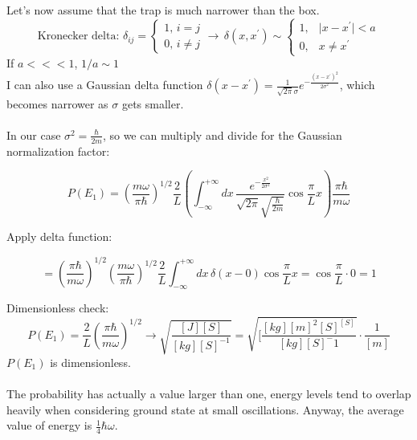 \noindent
Let's now assume that the trap is much narrower than the box.
\[\text{Kronecker delta: }  \delta_{i j}=\begin{cases}1,\, i=j \\ 0,\, i \neq j \end{cases} \rightarrow\, \delta(x, x^{\prime}) \sim\begin{cases}1,& \mid x-x^{\prime} \mid<a \\ 0, & x \neq x^{\prime}\end{cases}
\]
If $a<<<1$, $1/a\sim 1$\\
I can also use a Gaussian delta function  $\delta\left(x-x^{\prime}\right)=\frac{1}{\sqrt{2 \pi} \sigma} e^{-\frac{\left(x-x^{\prime}\right)^{2}}{2 \sigma^{2}}}$, which becomes narrower as $\sigma$ gets smaller.\\
\\
In our case $\sigma^2= \frac{\hbar}{2m}$, so we can multiply and divide for the Gaussian normalization factor:

$$P\left(E_{1}\right)=\left(\frac{m \omega}{ \pi \hbar}\right)^{1 / 2} \frac{2}{L}\left(\int_{-\infty}^{+\infty} d x\, \frac{e^{-\frac{x^{2}}{2\sigma^2}}}{\sqrt{2 \pi} \sqrt{\frac{\hbar}{2 m}}} \cos \frac{\pi}{L} x\right) \frac{ \pi \hbar}{m \omega}$$

\noindent
Apply delta function:

$$=\left(\frac{ \pi \hbar}{m\omega}\right)^{1 / 2}\left(\frac{m \omega}{ \pi \hbar}\right)^{1 / 2} \frac{2}{L}\int_{-\infty}^{+\infty} d x\, \delta(x-0) \cos \frac{\pi}{L} x=\cos \frac{\pi}{L} \cdot0=1$$

\noindent
Dimensionless check:
$$P\left(E_{1}\right)=\frac{2}{L}\left(\frac{ \pi \hbar}{m \omega}\right)^{1 / 2} \rightarrow \sqrt{\frac{[J][S]}{[k g][S]^{-1}}}=\sqrt{[\frac{[kg][m]^2[S]^[S]}{[kg][S]^-1}} \cdot \frac{1}{[m]}$$
$P\left(E_{1}\right)$ is dimensionless.\\
\\
\noindent
The probability has actually a value larger than one, energy levels tend to overlap heavily when considering ground state at small oscillations.
Anyway, the average value of energy is $\frac{1}{4}\hbar\omega$.

